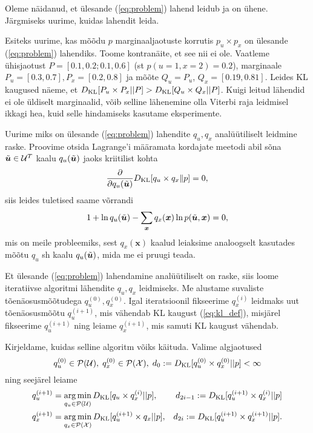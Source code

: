 Oleme näidanud, et ülesande (\ref{eq:problem}) lahend leidub ja on ühene. Järgmiseks uurime, kuidas lahendit leida.

Esiteks uurime, kas mõõdu $p$ marginaaljaotuste korrutis $p_u \times p_x$ on ülesande (\ref{eq:problem}) lahendiks. Toome kontranäite, et see nii ei ole. Vaatleme ühisjaotust $ P = [0.1, 0.2; 0.1, 0.6]$ (st $p(u=1,x=2)=0.2$), marginaale $P_u = [0.3, 0.7], P_x = [0.2, 0.8]$ ja mõõte $Q_u=P_u$, $Q_x = [0.19, 0.81]$. Leides KL kaugused näeme, et $D_{\mathrm{KL}}[P_u \times P_x || P] > D_{\mathrm{KL}}[Q_u \times Q_x || P]$. Kuigi leitud lähendid ei ole üldiselt marginaalid, võib selline lähenemine olla Viterbi raja leidmisel ikkagi hea, kuid selle hindamiseks kasutame eksperimente.

Uurime miks on ülesande (\ref{eq:problem}) lahendite $q_u, q_x$ analüütiliselt leidmine raske. Proovime otsida Lagrange'i määramata kordajate meetodi abil sõna $\Tilde{\bm{u}} \in \mathcal{U}^T$ kaalu $q_u(\Tilde{\bm{u}})$ jaoks kriitilist kohta
$$\frac{\partial}{\partial q_u(\Tilde{\bm{u}})} D_{\mathrm{KL}} [q_u \times q_x \| p] = 0,$$
siis leides tuletised saame võrrandi
$$1 + \ln q_u(\Tilde{\bm{u}}) - \sum_{\bm{x}}q_x(\bm{x})\ln p(\Tilde{\bm{u}}, \bm{x}) = 0,$$
mis on meile probleemiks, sest $q_x(\bm{x})$ kaalud leiaksime analoogselt kasutades mõõtu $q_u$ sh kaalu $q_u(\Tilde{\bm{u}})$, mida me ei pruugi teada.

Et ülesande (\ref{eq:problem}) lahendamine analüütiliselt on raske, siis loome iteratiivse algoritmi lähendite $q_u, q_x$ leidmiseks. Me alustame suvaliste tõenäosusmõõtudega $q_u^{(0)}, q_x^{(0)}$. Igal iteratsioonil fikseerime $q_x^{(i)}$ leidmaks uut tõenäosusmõõtu $q_u^{(i+1)}$, mis vähendab KL kaugust (\ref{eq:kl_def}), misjärel fikseerime $q_u^{(i+1)}$ ning leiame $q_x^{(i+1)}$, mis samuti KL kaugust vähendab.

Kirjeldame, kuidas selline algoritm võiks käituda. Valime algjaotused 
$$q_u^{(0)} \in \mathcal{P}(\mathcal{U}),\; q_x^{(0)} \in \mathcal{P}(\mathcal{X}),\; d_0 := D_{\mathrm{KL}}[q_u^{(0)} \times q_x^{(0)} || p] < \infty$$
ning seejärel leiame
\begin{align*}
    q_u^{(i+1)} &= \operatorname*{arg\,min}_{q_u \in \mathcal{P}(\mathcal{U})} D_{\mathrm{KL}}[q_u \times q_x^{(i)} || p],& d_{2i -1} := D_{\mathrm{KL}}[q_u^{(i+1)} \times q_x^{(i)} || p] \\
     q_x^{(i+1)} &= \operatorname*{arg\,min}_{q_x \in \mathcal{P}(\mathcal{X})} D_{\mathrm{KL}}[q_u^{(i+1)} \times q_x || p],& d_{2i} := D_{\mathrm{KL}}[q_u^{(i+1)} \times q_x^{(i+1)} || p].
\end{align*}


